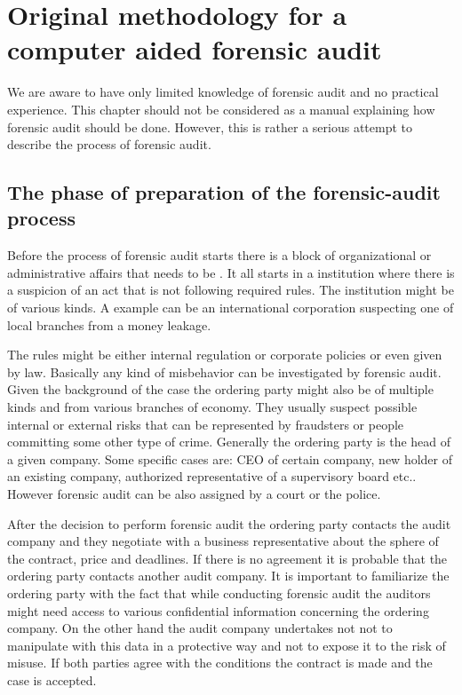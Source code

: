 \chapter{Original methodology for a computer aided forensic audit}


We are aware to have only limited knowledge of forensic audit and no practical experience. This chapter should not be considered as a manual explaining how forensic audit should be done.  However, this is rather a serious attempt to describe the process of forensic audit.


\section{The phase of preparation of the forensic-audit process}
Before the process of forensic audit starts there is a block of organizational or administrative affairs that needs to be . It all starts in a institution where there is a suspicion of an act that is not following required rules. The institution might be of various kinds. A example can be an international corporation suspecting one of local branches from a money leakage. 

The rules might be either internal regulation or corporate policies or even given by law. Basically any kind of misbehavior can be investigated by forensic audit. Given the background of the case the ordering party might also be of multiple kinds and from various branches of economy. They usually suspect possible internal or external risks that can be represented by fraudsters or people committing some other type of crime.  Generally the ordering party is the head of a given company. Some specific cases are: CEO of certain company, new holder of an existing company, authorized representative of a supervisory board etc.. However forensic audit can be also assigned by a court or the police. 

After the decision to perform forensic audit the ordering party contacts the audit company and they negotiate with a business representative about the sphere of the contract, price and deadlines. If there is no agreement it is probable that the ordering party contacts another audit company. It is important to familiarize the ordering party with the fact that while conducting forensic audit the auditors might need access to various confidential information concerning the ordering company. On the other hand the audit company undertakes not not to manipulate with this data in a protective way and not to expose it to the risk of misuse. If both parties agree with the conditions the contract is made and the case is accepted. 

